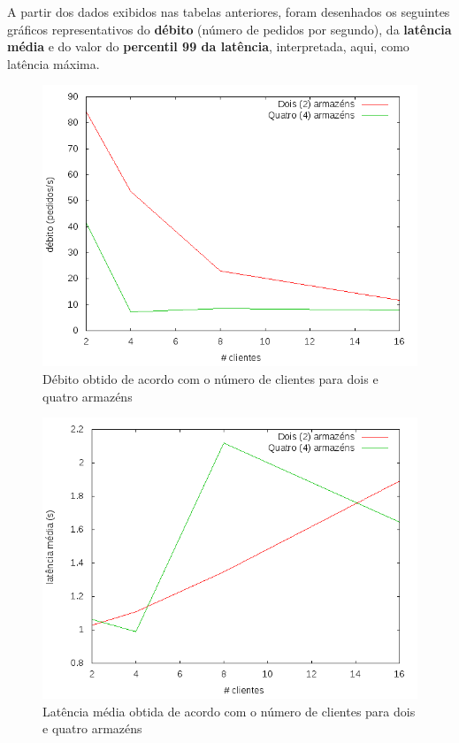 \newpage

A partir dos dados exibidos nas tabelas anteriores, foram desenhados os seguintes gráficos representativos do \textbf{débito} (número de pedidos por segundo), da \textbf{latência média} e do valor do \textbf{percentil 99 da latência}, interpretada, aqui, como latência máxima.

\begin{figure}[!h]
\centering
\includegraphics[scale=.4]{img/questao-1/ser-deb}
\caption{Débito obtido de acordo com o número de clientes para dois e quatro armazéns}
\end{figure}

\begin{figure}[!h]
\centering
\includegraphics[scale=.4]{img/questao-1/ser-lat-med}
\caption{Latência média obtida de acordo com o número de clientes para dois e quatro armazéns}
\end{figure}

